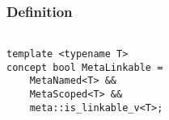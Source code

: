 
\subsubsection{Definition}

\begin{verbatim}

template <typename T>
concept bool MetaLinkable =
	MetaNamed<T> &&
	MetaScoped<T> &&
	meta::is_linkable_v<T>;

\end{verbatim}
